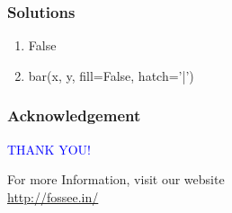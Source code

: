 \documentclass[presentation]{beamer}
\begin{document}
\begin{frame}
\frametitle{Solutions}
\label{sec-21}


\begin{enumerate}
\item False
\item bar(x, y, fill=False, hatch='|')
\end{enumerate}
\end{frame}
\begin{frame}
\frametitle{Acknowledgement}
\label{sec-22}

  \begin{block}{}
  \begin{center}
  \textcolor{blue}{\Large THANK YOU!} 
  \end{center}
  \end{block}
\begin{block}{}
  \begin{center}
    For more Information, visit our website\\
    \url{http://fossee.in/}
  \end{center}  
  \end{block}
\end{frame}
\end{document}
